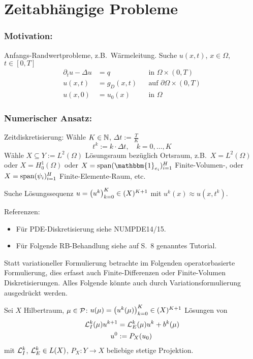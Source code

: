 \section{Zeitabhängige Probleme}
\label{sec-6}

\subsubsection*{Motivation:}
Anfangs-Randwertprobleme, z.B.\ Wärmeleitung. Suche $u(x,t)$, $x \in \Omega$, $t \in [0,T]$
\begin{align*}
	\partial_t u - \Delta u &= q & & \text{in } \Omega \times (0,T) \\
	u(x,t) &= g_D(x,t) & & \text{auf } \partial\Omega \times (0,T) \\
	u(x,0) &= u_0(x) & & \text{in } \Omega
\end{align*}

\subsubsection*{Numerischer Ansatz:}
Zeitdiskretisierung: Wähle $K \in \mathbb{N}$, $\Delta t := \frac{T}{K}$
\[
	t^k := k \cdot \Delta t, \quad k = 0,\ldots,K
\]
Wähle $X \subseteq Y := L^2(\Omega)$ Lösungsraum bezüglich Ortsraum, z.B.\ $X = L^2(\Omega)$ oder $X = H_0^1(\Omega)$ oder $X = \spn(\mathbbm{1}_{e_i})_{i=1}^{H}$ Finite-Volumen-, oder $X = \operatorname{span}(\psi_i)_{i=1}^H$ Finite-Elemente-Raum, etc.

Suche Lösungssequenz $u = \left(u^k\right)_{k=0}^K \in (X)^{K+1}$ mit $u^k(x) \approx u(x,t^k)$.

Referenzen:
\begin{itemize}
	\item Für PDE-Diskretisierung siehe NUMPDE14/15.
	\item Für Folgende RB-Behandlung siehe auf S.\ 8 genanntes Tutorial.
\end{itemize}

\vspace{10pt}

\begin{bem}
	Statt variationeller Formulierung betrachte im Folgenden operatorbasierte Formulierung, dies erfasst auch Finite-Differenzen oder Finite-Volumen Diskretisierungen.
	Alles Folgende könnte auch durch Variationsformulierung ausgedrückt werden.
\end{bem}

\begin{defn}
	Sei $X$ Hilbertraum, $\mu \in \mathcal{P}$: $u(\mu) = \left(u^k(\mu)\right)_{k=0}^K \in (X)^{K+1}$ Lösungen von
	\begin{align*}
		\mathcal{L}_I^k(\mu) u^{k+1} &= \mathcal{L}_E^k(\mu) u^k + b^k(\mu) \\
		u^0 &:= P_X(u_0)
	\end{align*}
	mit $\mathcal{L}_I^k$, $\mathcal{L}_E^k \in L(X)$, $P_X: Y \to X$ beliebige stetige Projektion.
\end{defn}

